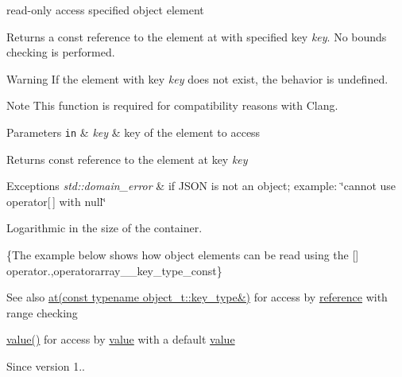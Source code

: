 read-\/only access specified object element 

Returns a const reference to the element at with specified key {\itshape key}. No bounds checking is performed.

\begin{DoxyWarning}{Warning}
If the element with key {\itshape key} does not exist, the behavior is undefined.
\end{DoxyWarning}
\begin{DoxyNote}{Note}
This function is required for compatibility reasons with Clang.
\end{DoxyNote}

\begin{DoxyParams}[1]{Parameters}
\mbox{\tt in}  & {\em key} & key of the element to access\\
\hline
\end{DoxyParams}
\begin{DoxyReturn}{Returns}
const reference to the element at key {\itshape key} 
\end{DoxyReturn}

\begin{DoxyExceptions}{Exceptions}
{\em std\+::domain\+\_\+error} & if J\+S\+ON is not an object; example\+: {\ttfamily \char`\"{}cannot use
operator\mbox{[}$\,$\mbox{]} with null\char`\"{}}\\
\hline
\end{DoxyExceptions}
Logarithmic in the size of the container.

\{The example below shows how object elements can be read using the {\ttfamily \mbox{[}\mbox{]}} operator.,operatorarray\+\_\+\+\_\+key\+\_\+type\+\_\+const\}

\begin{DoxySeeAlso}{See also}
\hyperlink{a00025_a7ed92d56cb313b243c1917696ffdf074}{at(const typename object\+\_\+t\+::key\+\_\+type\&)} for access by \hyperlink{a00025_a3ec8e17be8732fe436e9d6733f52b7a3}{reference} with range checking 

\hyperlink{a00025_a0a2cbbd95862a623e7dc5c37e67dead0}{value()} for access by \hyperlink{a00025_a0a2cbbd95862a623e7dc5c37e67dead0}{value} with a default \hyperlink{a00025_a0a2cbbd95862a623e7dc5c37e67dead0}{value}
\end{DoxySeeAlso}
\begin{DoxySince}{Since}
version 1.. 
\end{DoxySince}
